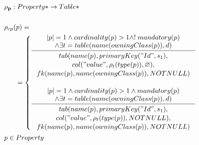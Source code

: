 \documentclass[11pt]{article}
\begin{document}
\begin{align*}
&	\mathbf{\rho_p} : Property* \rightarrow Table* \\ \\
&	\rho_{cp}(p) = \\
& \;\;\;\;\;\; =\begin{cases}
     	\inference{|p| = 1 \wedge cardinality(p) > 1 \wedge !\;mandatory(p) \\ 
     		\wedge 	\exists t = table(name(owningClass(p)), d)
     		}{\begin{gathered}
     			tab(name(p), primaryKey("Id", s_1), \\ col("value", \rho_t(type(p)), \varnothing), \\ fk(name(p), 			name(owningClass(p)), NOTNULL) \\
    	\end{gathered}}\\ \\
     	\inference{|p| = 1 \wedge  cardinality(p) > 1 \wedge mandatory(p) \\ 
     		\wedge \exists t = table(name(owningClass(p)), d) 
     		}{\begin{gathered}  
     			tab(name(p), primaryKey("Id", s_1), \\ 
     			col("value", \rho_t(type(p)), NOTNULL), \\ 			fk(name(p), name(owningClass(p)), NOTNULL)
    	 \end{gathered}}
 	\end{cases}\\
& 	p \in Property
\end{align*}
\end{document}
